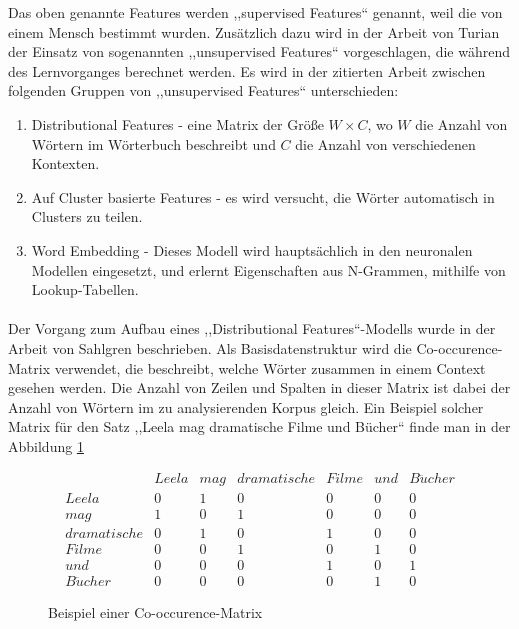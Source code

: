 Das oben genannte Features werden ,,supervised Features`` genannt, weil die von einem Mensch bestimmt wurden. Zusätzlich dazu wird in der Arbeit von Turian\cite{turian2010word} der Einsatz von sogenannten ,,unsupervised Features`` vorgeschlagen, die während des Lernvorganges berechnet werden. Es wird in der zitierten Arbeit zwischen folgenden Gruppen von ,,unsupervised Features`` unterschieden:
\begin{enumerate}
\item Distributional Features - eine Matrix der Größe $W \times C$, wo $W$ die Anzahl von Wörtern im Wörterbuch beschreibt und $C$ die Anzahl von verschiedenen Kontexten.
\item Auf Cluster basierte Features - es wird versucht, die Wörter automatisch in Clusters zu teilen.
\item Word Embedding - Dieses Modell wird hauptsächlich in den neuronalen Modellen eingesetzt, und erlernt Eigenschaften aus N-Grammen, mithilfe von Lookup-Tabellen.
\end{enumerate}

\paragraph{}
Der Vorgang zum Aufbau eines ,,Distributional Features``-Modells wurde in der Arbeit von Sahlgren\cite{sahlgren2006word} beschrieben. Als Basisdatenstruktur wird die Co-occurence-Matrix verwendet, die beschreibt, welche Wörter zusammen in einem Context gesehen werden. Die Anzahl von Zeilen und Spalten in dieser Matrix ist dabei der Anzahl von Wörtern im zu analysierenden Korpus gleich. Ein Beispiel solcher Matrix für den Satz ,,Leela mag dramatische Filme und Bücher`` finde man in der Abbildung \ref{fig:COOC-MAT}

\begin{figure}[ht]
\vbox{\small}
$$
\begin{array}{ccccccc}
 & Leela & mag & dramatische & Filme & und & B\ddot{u}cher \\ 
Leela & 0 & 1 & 0 & 0 & 0 & 0 \\ 
mag & 1 & 0 & 1 & 0 & 0 & 0 \\ 
dramatische & 0 & 1 & 0 & 1 & 0 & 0 \\ 
Filme & 0 & 0 & 1 & 0 & 1 & 0 \\ 
und & 0 & 0 & 0 & 1 & 0 & 1 \\ 
B\ddot{u}cher & 0 & 0 & 0 & 0 & 1 & 0
\end{array} 
$$
\caption{Beispiel einer Co-occurence-Matrix}
\label{fig:COOC-MAT}
\end{figure}

